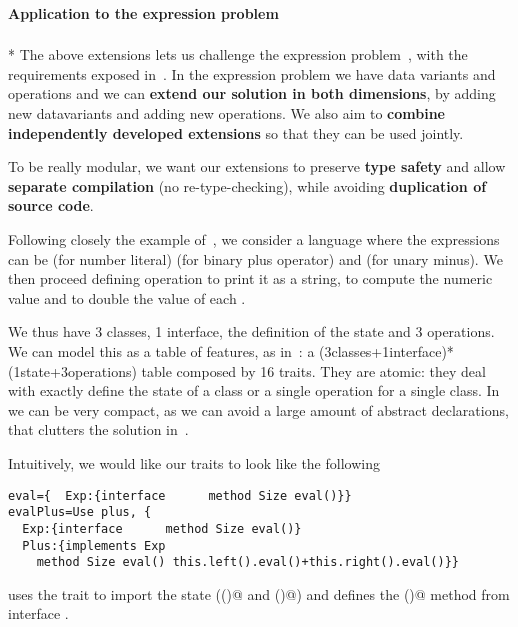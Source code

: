 \paragraph{Application to the expression problem}${}_{}$\\*
The above extensions lets us challenge the expression problem~\cite{wadler1998expression},
with the requirements exposed in~\cite{scala}.
In the expression problem we have data variants and operations and we can
\textbf{extend our solution in both dimensions},
by adding new datavariants and adding new operations.
We also aim to \textbf{combine independently developed extensions} so
that they can be used jointly.

To be really modular, we want our extensions to
preserve \textbf{type safety}
and allow \textbf{separate compilation} (no re-type-checking),
while avoiding \textbf{duplication of source code}.

Following closely
the example of~\cite{},
we consider a language where the
expressions \Q@Exp@ can
be \Q@Num@ (for number literal)
\Q@Plus@ (for binary plus operator)
and \Q@Neg@ (for unary minus).
We then proceed defining operation
\Q@show@ to print it as a string,
 \Q@eval@ to compute the numeric value and 
\Q@double@ to double the value of each \Q@Num@.

We thus have 3 classes, 1 interface,
the definition of the state and 3 operations.
We can model this
as a table of features, as in~\cite{Deepfjig}:
a (3classes+1interface)*(1state+3operations)
table composed by 16 traits.
They are atomic: they deal with exactly 
define the state of a class
or a single operation for a single class.
In \name we can be very compact,
 as we can avoid a large amount of abstract declarations,
that clutters the solution in~\cite{Deepfjig}.

Intuitively, we would like our traits to look like the following 
\begin{lstlisting}
eval={  Exp:{interface      method Size eval()}}
evalPlus=Use plus, {  
  Exp:{interface      method Size eval()}
  Plus:{implements Exp
    method Size eval() this.left().eval()+this.right().eval()}}
\end{lstlisting}
\Q@basePlus@ uses the trait \Q@plus@ to import the state (\Q@left()@ and \Q@right()@)
and defines the \Q@eval()@ method from interface \Q@Exp@.

